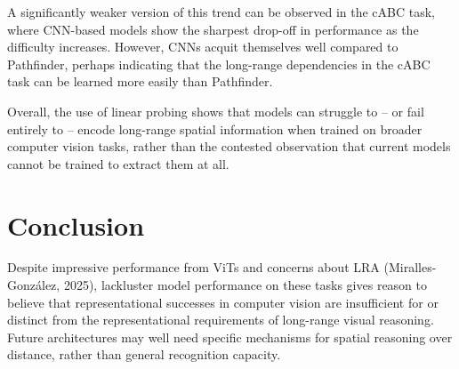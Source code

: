 \documentclass[10pt,letterpaper]{article}
\begin{document}
A significantly weaker version of this trend can be observed in the cABC task, where CNN-based models show the sharpest drop-off in performance as the difficulty increases. However, CNNs acquit themselves well compared to Pathfinder, perhaps indicating that the long-range dependencies in the cABC task can be learned more easily than Pathfinder.

Overall, the use of linear probing shows that models can struggle to -- or fail entirely to -- encode long-range spatial information when trained on broader computer vision tasks, rather than the contested observation that current models cannot be trained to extract them at all.


\section{Conclusion}

Despite impressive performance from ViTs and concerns about LRA (Miralles{-}Gonz{\'{a}}lez, 2025), lackluster model performance on these tasks gives reason to believe that representational successes in computer vision are insufficient for or distinct from the representational requirements of long-range visual reasoning. Future architectures may well need specific mechanisms for spatial reasoning over distance, rather than general recognition capacity. 



\nocite{Serre2018a}
\nocite{Serre2018b}
\nocite{LRA}
\nocite{Amos}
\nocite{Wightman}
\nocite{Dosovitskiy}
\nocite{Miralles}
\nocite{Houtkamp}
\nocite{Gu}



\newpage




\setlength{\bibleftmargin}{.125in}
\setlength{\bibindent}{-\bibleftmargin}


\end{document}
